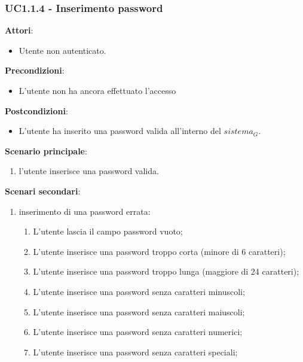 \subsubsection{UC1.1.4 - Inserimento password}\label{usecase:1_1_4}
\textbf{Attori}:
\begin{itemize}
    \item Utente non autenticato.
\end{itemize}
\textbf{Precondizioni}:
\begin{itemize}
    \item L'utente non ha ancora effettuato l'accesso
\end{itemize}
\textbf{Postcondizioni}:
\begin{itemize}
    \item L'utente ha inserito una password valida all'interno del $\textit{sistema}_G$.
\end{itemize}
\textbf{Scenario principale}:
\begin{enumerate}
    \item l'utente inserisce una password valida.
\end{enumerate}
\textbf{Scenari secondari}:

\begin{enumerate}
    \item inserimento di una password errata:
    \begin{enumerate}
            \item L'utente lascia il campo password vuoto;
            \item L'utente inserisce una password troppo corta (minore di 6 caratteri);
            \item L'utente inserisce una password troppo lunga (maggiore di 24 caratteri);
            \item L'utente inserisce una password senza caratteri minuscoli;
            \item L'utente inserisce una password senza caratteri maiuscoli;
            \item L'utente inserisce una password senza caratteri numerici;
            \item L'utente inserisce una password senza caratteri speciali;
        \end{enumerate} 
\end{enumerate}